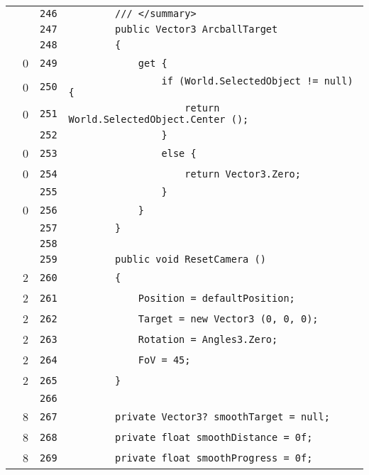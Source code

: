 \documentclass[a4paper,10pt]{article}
\begin{document}
\begin{longtable}[l]{lrrl}
\cellcolor{gray} &  & \verb~246~ & \verb~        /// </summary>~\\
\cellcolor{gray} &  & \verb~247~ & \verb~        public Vector3 ArcballTarget~\\
\cellcolor{gray} &  & \verb~248~ & \verb~        {~\\
\cellcolor{red} & 0 & \verb~249~ & \verb~            get {~\\
\cellcolor{red} & 0 & \verb~250~ & \verb~                if (World.SelectedObject != null) {~\\
\cellcolor{red} & 0 & \verb~251~ & \verb~                    return World.SelectedObject.Center ();~\\
\cellcolor{gray} &  & \verb~252~ & \verb~                }~\\
\cellcolor{red} & 0 & \verb~253~ & \verb~                else {~\\
\cellcolor{red} & 0 & \verb~254~ & \verb~                    return Vector3.Zero;~\\
\cellcolor{gray} &  & \verb~255~ & \verb~                }~\\
\cellcolor{red} & 0 & \verb~256~ & \verb~            }~\\
\cellcolor{gray} &  & \verb~257~ & \verb~        }~\\
\cellcolor{gray} &  & \verb~258~ & \verb~~\\
\cellcolor{gray} &  & \verb~259~ & \verb~        public void ResetCamera ()~\\
\cellcolor{green} & 2 & \verb~260~ & \verb~        {~\\
\cellcolor{green} & 2 & \verb~261~ & \verb~            Position = defaultPosition;~\\
\cellcolor{green} & 2 & \verb~262~ & \verb~            Target = new Vector3 (0, 0, 0);~\\
\cellcolor{green} & 2 & \verb~263~ & \verb~            Rotation = Angles3.Zero;~\\
\cellcolor{green} & 2 & \verb~264~ & \verb~            FoV = 45;~\\
\cellcolor{green} & 2 & \verb~265~ & \verb~        }~\\
\cellcolor{gray} &  & \verb~266~ & \verb~~\\
\cellcolor{green} & 8 & \verb~267~ & \verb~        private Vector3? smoothTarget = null;~\\
\cellcolor{green} & 8 & \verb~268~ & \verb~        private float smoothDistance = 0f;~\\
\cellcolor{green} & 8 & \verb~269~ & \verb~        private float smoothProgress = 0f;~\\

\end{longtable}
\end{document}
